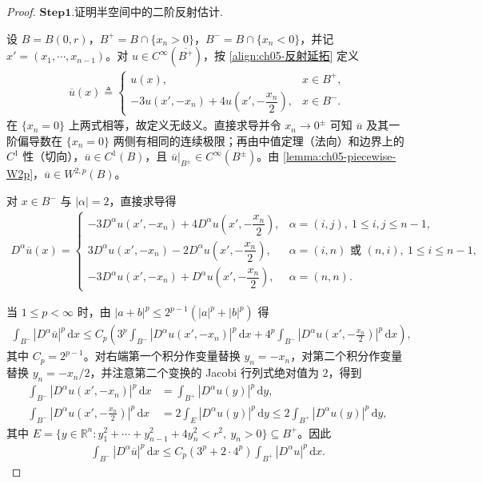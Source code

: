 \documentclass[../../main.tex]{subfiles}%
\begin{document}
\begin{proof}
\noindent$\mathbf{Step}\bm{1}$.{\heiti 证明半空间中的二阶反射估计.}

设 $B=B(0,r)$，$B^{+}=B\cap\{x_n>0\}$，$B^{-}=B\cap\{x_n<0\}$，并记 $x'=(x_1,\cdots,x_{n-1})$。对 $u\in C^{\infty}(\overline{B^{+}})$，按 \eqref{align:ch05-反射延拓} 定义
\begin{align*}
\overline u(x)\triangleq
\begin{cases}
u(x), & x\in B^{+},\\
-3u(x',-x_n)+4u\left(x',-\dfrac{x_n}{2}\right), & x\in B^{-}.
\end{cases}
\end{align*}
在 $\{x_n=0\}$ 上两式相等，故定义无歧义。直接求导并令 $x_n\to0^{\pm}$ 可知 $\overline u$ 及其一阶偏导数在 $\{x_n=0\}$ 两侧有相同的连续极限；再由中值定理（法向）和边界上的 $C^{1}$ 性（切向），$\overline u\in C^{1}(B)$，且 $\overline u|_{B^{\pm}}\in C^{\infty}(B^{\pm})$。由 \cref{lemma:ch05-piecewise-W2p}，$\overline u\in W^{2,p}(B)$。

对 $x\in B^{-}$ 与 $|\alpha|=2$，直接求导得
\begin{align*}
D^{\alpha}\overline u(x)=
\begin{cases}
-3D^{\alpha}u(x',-x_n)+4D^{\alpha}u\left(x',-\dfrac{x_n}{2}\right), & \alpha=(i,j),\ 1\leqslant i,j\leqslant n-1,\\[4pt]
3D^{\alpha}u(x',-x_n)-2D^{\alpha}u\left(x',-\dfrac{x_n}{2}\right), & \alpha=(i,n)\text{ 或 }(n,i),\ 1\leqslant i\leqslant n-1,\\[4pt]
-3D^{\alpha}u(x',-x_n)+D^{\alpha}u\left(x',-\dfrac{x_n}{2}\right), & \alpha=(n,n).
\end{cases}
\end{align*}

当 $1\leqslant p<\infty$ 时，由 $|a+b|^p\leqslant 2^{p-1}(|a|^p+|b|^p)$ 得
\begin{align*}
\int_{B^{-}}|D^{\alpha}\overline u|^p\,\mathrm{d}x
\leqslant C_p\left(3^p\int_{B^{-}}|D^{\alpha}u(x',-x_n)|^p\,\mathrm{d}x
+4^p\int_{B^{-}}\left|D^{\alpha}u\left(x',-\frac{x_n}{2}\right)\right|^p\,\mathrm{d}x\right),
\end{align*}
其中 $C_p=2^{p-1}$。对右端第一个积分作变量替换 $y_n=-x_n$，对第二个积分作变量替换 $y_n=-x_n/2$，并注意第二个变换的 Jacobi 行列式绝对值为 $2$，得到
\begin{align*}
\int_{B^{-}}|D^{\alpha}u(x',-x_n)|^p\,\mathrm{d}x
&=\int_{B^{+}}|D^{\alpha}u(y)|^p\,\mathrm{d}y,\\
\int_{B^{-}}\left|D^{\alpha}u\left(x',-\frac{x_n}{2}\right)\right|^p\,\mathrm{d}x
&=2\int_{E}|D^{\alpha}u(y)|^p\,\mathrm{d}y
\leqslant2\int_{B^{+}}|D^{\alpha}u(y)|^p\,\mathrm{d}y,
\end{align*}
其中 $E=\{y\in\mathbb{R}^{n}:y_1^2+\cdots+y_{n-1}^2+4y_n^2<r^2,\ y_n>0\}\subseteq B^{+}$。因此
\begin{align*}
\int_{B^{-}}|D^{\alpha}\overline u|^p\,\mathrm{d}x
\leqslant C_p(3^p+2\cdot4^p)\int_{B^{+}}|D^{\alpha}u|^p\,\mathrm{d}x.
\end{align*}


\end{proof}
\end{document}
